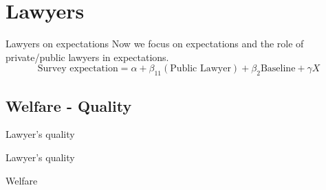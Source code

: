 \documentclass[8pt]{beamer}
\begin{document}
\section{Lawyers}

\begin{frame}{Lawyers on expectations}
    Now we focus on expectations and the role of private/public lawyers in expectations. 
\[\text{Survey expectation}= \alpha+\beta_11(\text{Public Lawyer}) + \beta_2 \text{Baseline} + \gamma X\]
\begin{table}[H]
      \centering
        \tiny{}
\end{table}

\end{frame}


\subsection{Welfare - Quality}
\begin{frame}{Lawyer's quality}

 \begin{table}[H] 
 \begin{subtable}{1.\textwidth}
 \begin{center}
 \tiny{}
 \end{center}
 \end{subtable}
 \end{table}  
 
\end{frame}


\begin{frame}{Lawyer's quality}

 \begin{table}[H] 
 \begin{subtable}{1.\textwidth}
 \begin{center}
 \tiny{}
 \end{center}
 \end{subtable}
 \end{table}  
 
\end{frame}


\begin{frame}{Welfare}

 \begin{table}[H] 
 \begin{subtable}{1.\textwidth}
 \begin{center}
 \tiny{}
 \end{center}
 \end{subtable}
 \end{table}  
 
\end{frame}
\end{document}
